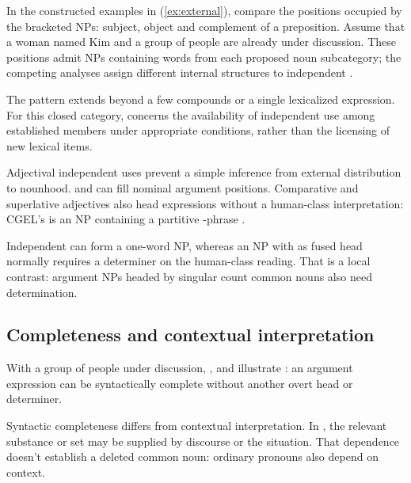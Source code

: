\documentclass[12pt]{article}
\begin{document}
In the constructed examples in (\ref{ex:external}), compare the positions occupied by the bracketed NPs: subject, object and complement of a preposition. Assume that a woman named Kim and a group of people are already under discussion. These positions admit NPs containing words from each proposed noun subcategory; the competing analyses assign different internal structures to independent .

\ea\label{ex:external}
\ea {}\qquad {}\qquad {}
\ex {}\qquad {}\qquad {}
\ex {}\qquad {}\qquad {}
\ex {}\qquad {}\qquad {}
\z\z

The pattern extends beyond a few compounds or a single lexicalized expression. For this closed category,  concerns the availability of independent use among established members under appropriate conditions, rather than the licensing of new lexical items.

Adjectival independent uses prevent a simple inference from external distribution to nounhood.  and  can fill nominal argument positions. Comparative and superlative adjectives also head expressions without a human-class interpretation: CGEL's  is an NP containing a partitive -phrase \citep[332--333, 416--423]{huddleston2002}.

Independent  can form a one-word NP, whereas an NP with  as fused head normally requires a determiner on the human-class reading. That is a local contrast: argument NPs headed by singular count common nouns also need determination.

\subsection{Completeness and contextual interpretation}

With a group of people under discussion, ,  and  illustrate : an argument expression can be syntactically complete without another overt head or determiner.

Syntactic completeness differs from contextual interpretation. In , the relevant substance or set may be supplied by discourse or the situation. That dependence doesn't establish a deleted common noun: ordinary pronouns also depend on context.
\end{document}
